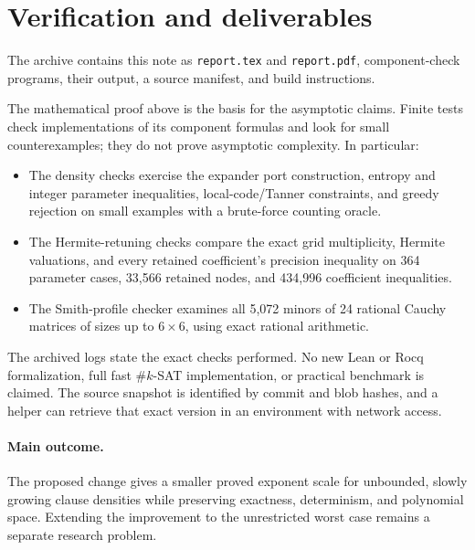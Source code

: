 \documentclass[11pt]{article}
\theoremstyle{remark}
\begin{document}
\section{Verification and deliverables}\label{sec:verification}
The archive contains this note as \texttt{report.tex} and
\texttt{report.pdf}, component-check programs, their output,
a source manifest, and build instructions.

The mathematical proof above is the basis for the asymptotic claims.
Finite tests check implementations of its component formulas and
look for small counterexamples; they do not prove asymptotic complexity.
In particular:
\begin{itemize}
\item The density checks exercise the expander port construction,
entropy and integer parameter inequalities, local-code/Tanner
constraints, and greedy rejection on small examples with a
brute-force counting oracle.
\item The Hermite-retuning checks compare the exact grid
multiplicity, Hermite valuations, and every retained coefficient's
precision inequality on 364 parameter cases, 33,566 retained nodes,
and 434,996 coefficient inequalities.
\item The Smith-profile checker examines all 5,072 minors of
24 rational Cauchy matrices of sizes up to \(6\times6\), using exact
rational arithmetic.
\end{itemize}
The archived logs state the exact checks performed.
No new Lean or Rocq formalization, full fast \(\#k\)-SAT implementation,
or practical benchmark is claimed. The source snapshot is identified
by commit and blob hashes, and a helper can retrieve that exact version
in an environment with network access.

\paragraph{Main outcome.}
The proposed change gives a smaller proved exponent scale for
unbounded, slowly growing clause densities while preserving exactness,
determinism, and polynomial space. Extending the improvement to the
unrestricted worst case remains a separate research problem.
\end{document}
